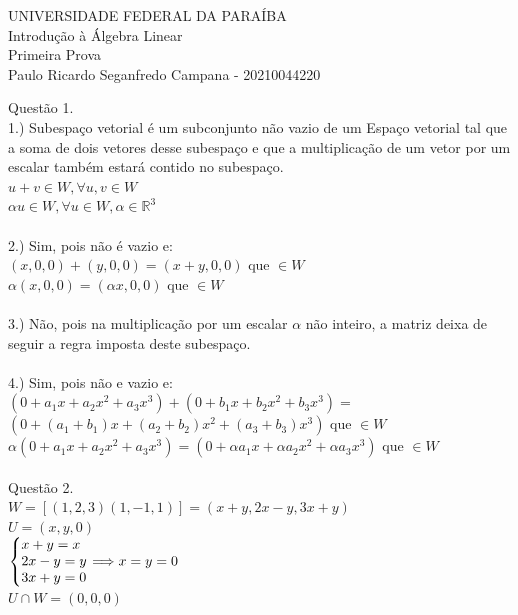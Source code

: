 \documentclass[12pt]{article}
\begin{document}
\pagestyle{empty}
\begin{center}
	UNIVERSIDADE FEDERAL DA PARAÍBA\\
	Introdução à Álgebra Linear\\
	Primeira Prova\\
	Paulo Ricardo Seganfredo Campana - 20210044220\\
\end{center}

Questão 1.\\
1.) Subespaço vetorial é um subconjunto não vazio de um Espaço vetorial tal que a soma de dois vetores desse subespaço e que a multiplicação de um vetor por um escalar também estará contido no subespaço.\\
$u+v\in W, \forall u,v\in W$\\
$\alpha u \in W, \forall u \in W, \alpha \in \mathds{R}^{3}$\\\\
2.) Sim, pois não é vazio e:\\
$(x,0,0)+(y,0,0)=(x+y,0,0)$ que $\in W$\\
$\alpha (x,0,0) = (\alpha x,0,0)$ que $\in W$\\\\
3.) Não, pois na multiplicação por um escalar $\alpha$ não inteiro, a matriz deixa de seguir a regra imposta deste subespaço.\\\\
4.) Sim, pois não e vazio e:\\
$(0+a_{1}x+a_{2}x^{2}+a_{3}x^{3}) + (0+b_{1}x+b_{2}x^{2}+b_{3}x^{3}) =$\\ 
$(0+(a_{1}+b_{1})x + (a_{2}+b_{2})x^{2}+(a_{3}+b_{3})x^{3})$ que $\in W$\\
$\alpha(0+a_{1}x+a_{2}x^{2}+a_{3}x^{3}) = (0 + \alpha a_{1}x+\alpha a_{2}x^{2}+\alpha a_{3}x^{3})$ que $\in W$\\\\

Questão 2.\\
$W = [(1,2,3)(1,-1,1)] = (x+y,2x-y,3x+y)$\\
$U = (x,y,0)$\\
$\left\{\begin{array}{@{}l@{}}
	x+y=x\\
	2x-y=y\\
	3x+y=0
\end{array}\right. \Longrightarrow x=y=0$\\
$U\cap W = (0,0,0)$\\\\
\end{document}

